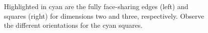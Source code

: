 \begin{figure}[t!]
\begin{subfigure}{.47\textwidth}
        \label{fig:tiling_six}
    \end{subfigure}
    \caption{Highlighted in cyan are the fully face-sharing edges (left) and squares (right) for dimensions two and three, respectively. Observe the different orientations for the cyan squares.}
    \label{fig:tilings_five_six}
\end{figure}
